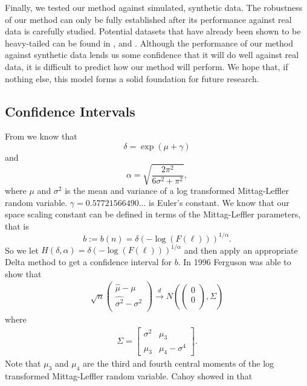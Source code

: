 \documentclass[honours,12pt,twoside, openright]{unswthesis}
\newcommand{\1}{\mathbf 1}
\newcommand{\cd}{\overset{d}{\longrightarrow}}
\numberwithin{equation}{section}
\theoremstyle{definition}
\theoremstyle{remark}
\begin{document}
Finally, we tested our method against simulated, synthetic data. The robustness of our method can only be fully established after its performance against real data is carefully studied. Potential datasets that have already been shown to be heavy-tailed can be found in \cite{Karsai2012}, \cite{Resnick1995} and \cite{Mainardi2000}. Although the performance of our method against synthetic data lends us some confidence that it will do well against real data, it is difficult to predict how our method will perform. We hope that, if nothing else, this model forms a solid foundation for future research.

\begin{appendices}
\chapter{Confidence Intervals}
From \cite{Cahoy2013} we know that
\[
\delta=\exp(\mu +\gamma)
\]
and
\[
\alpha=\sqrt{\frac{2\pi^2}{6\sigma^2+\pi^2}},
\]
where $\mu$ and $\sigma^2$ is the mean and variance of a log transformed Mittag-Leffler random variable. $\gamma=0.57721566490...$ is Euler's constant. We know that our space scaling constant can be defined in terms of the Mittag-Leffler parameters, that is
\[ 
b:=b(n)=\delta(-\log(F(\ell)))^{1/\alpha}.
\]
So we let $H(\delta,\alpha)=\delta(-\log(F(\ell)))^{1/\alpha}$ and then apply an appropriate Delta method to get a confidence interval for $b$. In 1996 Ferguson was able to show that \cite{Ferguson1996}
\begin{align*}
	\sqrt{n}\begin{pmatrix}
				\hat{\mu}-\mu\\
				\hat{\sigma^2}-\sigma^2\\				
			\end{pmatrix}
			\cd
			N\left(\begin{pmatrix}0\\0\\ \end{pmatrix},\Sigma	\right)
\end{align*}
where
\begin{align*}
	\Sigma=\begin{bmatrix}
		\sigma^2	& \mu_3\\
		\mu_3		& \mu_4-\sigma^4
	\end{bmatrix}.
\end{align*}
Note that $\mu_3$ and $\mu_4$ are the third and fourth central moments of the log transformed Mittag-Leffler random variable. Cahoy showed in \cite{Cahoy2013} that

\end{appendices}
\end{document}
